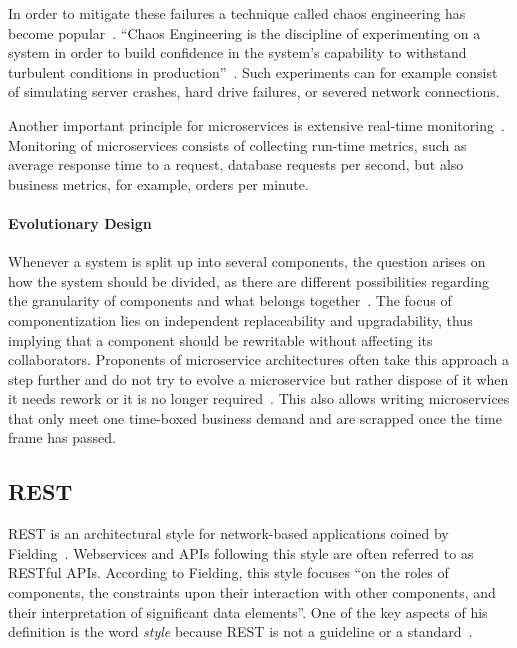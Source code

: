 In order to mitigate these failures a technique called chaos engineering has become popular~\cite{CEC2018}.
``Chaos Engineering is the discipline of experimenting on a system in order to build confidence in the system's capability to withstand turbulent conditions in production''~\cite{CEC2018}.
Such experiments can for example consist of simulating server crashes, hard drive failures, or severed network connections.

Another important principle for microservices is extensive real-time monitoring~\cite{Lewis2014}.
Monitoring of microservices consists of collecting run-time metrics, such as average response time to a request, database requests per second, but also business metrics, for example, orders per minute.

\paragraph{Evolutionary Design}

Whenever a system is split up into several components, the question arises on how the system should be divided, as there are different possibilities regarding the granularity of components and what belongs together~\cite{Lewis2014}.
The focus of componentization lies on independent replaceability and upgradability, thus implying that a component should be rewritable without affecting its collaborators.
Proponents of microservice architectures often take this approach a step further and do not try to evolve a microservice but rather dispose of it when it needs rework or it is no longer required~\cite{Fowler2016,Lewis2014}.
This also allows writing microservices that only meet one time-boxed business demand and are scrapped once the time frame has passed.

\subsection{\acf{REST}}\label{sec:rest}

\ac{REST} is an architectural style for network-based applications coined by Fielding~\cite{Fielding2000}.
Webservices and \acp{API} following this style are often referred to as \acs{REST}ful \acp{API}.
According to Fielding, this style focuses ``on the roles of components, the constraints upon their interaction with other components, and their interpretation of significant data elements''.
One of the key aspects of his definition is the word \textit{style} because \ac{REST} is not a guideline or a standard~\cite{Malakhov2018}.

